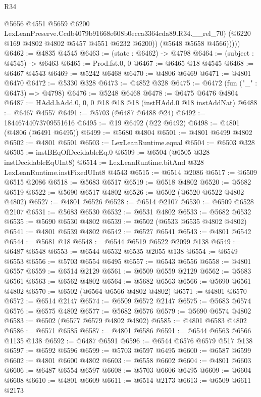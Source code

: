 \begin{lexlean}{R34}
\begin{coremodule}
                @5656
                @4551
                @5659
                @6200
                LexLeanPreserve.Ccdb4079b91668e608b0ecca3364cda89.R34.__rel_70)
              (@6220 @169 @4802 @4802 @5457 @4551 @6232 @6200))
            (@5648 @5658 @4566)))))
@6462 := @4835 @4545
@6463 := (state : @6462) -> @4798
@6464 := (subject : @4545) -> @6463
@6465 := Prod.fst.{0, 0}
@6467 := @6465 @18 @4545
@6468 := @6467 @4543
@6469 := @5242 @6468
@6470 := @4806 @6469
@6471 := @4801 @6470
@6472 := @5330 @328
@6473 := @4852 @328
@6475 := @6472 (fun ("_" : @6473) => @4798)
@6476 := @5248 @6468
@6478 := @6475 @6476 @4804
@6487 := HAdd.hAdd.{0, 0, 0} @18 @18 @18 (instHAdd.{0} @18 instAddNat)
@6488 := @6467 @4557
@6491 := @5703 (@6487 @6488 @24)
@6492 := 18446744073709551616
@6495 := @19 @6492 (@22 @6492)
@6498 := @4801 (@4806 (@6491 @6495))
@6499 := @5680 @4804
@6501 := @4801 @6499 @4802
@6502 := @4801 @6501
@6503 := LexLeanRuntime.equal
@6504 := @6503 @328
@6505 := instBEqOfDecidableEq.{0}
@6509 := @6504 (@6505 @328 instDecidableEqUInt8)
@6514 := LexLeanRuntime.bitAnd @328 LexLeanRuntime.instFixedUInt8 @4543
@6515 := @6514 @2086
@6517 := @6509 @6515 @2086
@6518 := @5683 @6517
@6519 := @6518 @4802
@6520 := @5682 @6519
@6522 := @5690 @6517 @4802
@6526 := @6502 (@6520 @6522 @4802 @4802)
@6527 := @4801 @6526
@6528 := @6514 @2107
@6530 := @6509 @6528 @2107
@6531 := @5683 @6530
@6532 := @6531 @4802
@6533 := @5682 @6532
@6535 := @5690 @6530 @4802
@6539 := @6502 (@6533 @6535 @4802 @4802)
@6541 := @4801 @6539 @4802
@6542 := @6527 @6541
@6543 := @4801 @6542
@6544 := @5681 @18
@6548 := @6544 @6519 @6522 @2099 @138
@6549 := @6487 @6548
@6553 := @6544 @6532 @6535 @2055 @138
@6554 := @6549 @6553
@6556 := @5703 @6554 @6495
@6557 := @6543 @6556
@6558 := @4801 @6557
@6559 := @6514 @2129
@6561 := @6509 @6559 @2129
@6562 := @5683 @6561
@6563 := @6562 @4802
@6564 := @5682 @6563
@6566 := @5690 @6561 @4802
@6570 := @6502 (@6564 @6566 @4802 @4802)
@6571 := @4801 @6570
@6572 := @6514 @2147
@6574 := @6509 @6572 @2147
@6575 := @5683 @6574
@6576 := @6575 @4802
@6577 := @5682 @6576
@6579 := @5690 @6574 @4802
@6583 := @6502 (@6577 @6579 @4802 @4802)
@6585 := @4801 @6583 @4802
@6586 := @6571 @6585
@6587 := @4801 @6586
@6591 := @6544 @6563 @6566 @1135 @138
@6592 := @6487 @6591
@6596 := @6544 @6576 @6579 @517 @138
@6597 := @6592 @6596
@6599 := @5703 @6597 @6495
@6600 := @6587 @6599
@6602 := @4801 @6600 @4802
@6603 := @6558 @6602
@6604 := @4801 @6603
@6606 := @6487 @6554 @6597
@6608 := @5703 @6606 @6495
@6609 := @6604 @6608
@6610 := @4801 @6609
@6611 := @6514 @2173
@6613 := @6509 @6611 @2173

\end{coremodule}
\end{lexlean}

